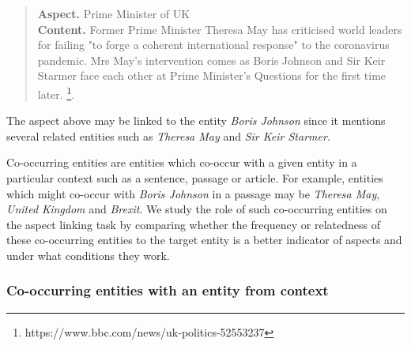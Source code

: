 \begin{quote}
    \textbf{Aspect.} Prime Minister of UK \\
    \textbf{Content.}
    Former Prime Minister Theresa May has criticised world leaders for failing "to forge a coherent international response" to the coronavirus pandemic. Mrs May's intervention comes as Boris Johnson and Sir Keir Starmer face each other at Prime Minister's Questions for the first time later. \footnote{https://www.bbc.com/news/uk-politics-52553237}.
\end{quote}
The aspect above may be linked to the entity \textit{Boris Johnson} since it mentions several related entities such as \textit{Theresa May} and \textit{Sir Keir Starmer}. 


Co-occurring entities are entities which co-occur with a given entity in a particular context such as a sentence, passage or article. For example, entities which might co-occur with \textit{Boris Johnson} in a passage may be \textit{Theresa May}, \textit{United Kingdom} and \textit{Brexit}. We study the role of such co-occurring entities on the aspect linking task by comparing whether the frequency or relatedness of these co-occurring entities to the target entity is a better indicator of aspects and under what conditions they work. 


\subsubsection{Co-occurring entities with an entity from context}
\label{subsubsec:Co-occurring entities with an entity from context}


    
    
